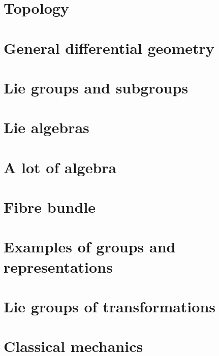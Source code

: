 \chapter{Topology}              \label{chap_topology}



\chapter{General differential geometry} \label{Chapitre_FB}


\chapter{Lie groups and subgroups}


\chapter{Lie algebras}
  
 





\chapter{A lot of algebra}




\chapter{Fibre bundle}



\chapter{Examples of groups and representations}        \label{ChapThoComsGroupes}



\chapter{Lie groups of transformations}


\chapter{Classical mechanics}



